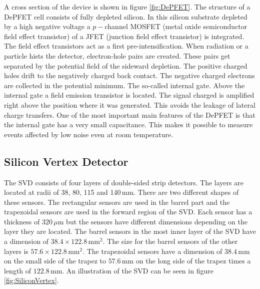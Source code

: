 \documentclass[a4paper,11pt,twosided,final,german,openbib,pdftex,listof=totoc,bibliography=totoc]{scrbook}
\begin{document}
A cross section of the device is shown in figure \ref{fig:DePFET}. The structure of a DePFET cell consists of fully depleted silicon. In this silicon substrate depleted by a high negative voltage a $p-$channel MOSFET (metal oxide semiconductor field effect transistor) of a JFET (junction field effect transistor) is integrated. The field effect transistors act as a first pre-intensification. When radiation or a particle hists the detector, electron-hole pairs are created. These pairs get separated by the potential field of the sideward depletion. The positive charged holes drift to the negatively charged back contact. The negative charged electrons are collected in the potential minimum. The so-called internal gate. Above the internal gate a field emission transistor is located. The signal charged is amplified right above the position where it was generated. This avoids the leakage of lateral charge transfers. One of the most important main features of the DePFET is that the internal gate has a very small capacitance. This makes it possible to measure events affected by low noise even at room temperature.\cite{B2TR}

\subsection{Silicon Vertex Detector}
\label{sec:Silicon}

The SVD consists of four layers of double-sided strip detectors. The layers are located at radii of 38, 80, 115 and 140$\,\textrm{mm}$. There are two different shapes of these sensors. The rectangular sensors are used in the barrel part and the trapezoidal sensors are used in the forward region of the SVD. Each sensor has a thickness of $320\,\mu\textrm{m}$ but the sensors have different dimensions depending on the layer they are located. The barrel sensors in the most inner layer of the SVD have a dimension of $38.4 \times 122.8\,\textrm{mm}^2$. The size for the barrel sensors of the other layers is $57.6 \times 122.8\,\textrm{mm}^2$. The trapezoidal sensors have a dimension of $38.4\,\textrm{mm}$ on the small side of the trapez to $57.6\,\textrm{mm}$ on the long side of the trapez times a length of $122.8\,\textrm{mm}$.\cite{B2TR} An illustration of the SVD can be seen in figure \ref{fig:SiliconVertex}. 
\end{document}
